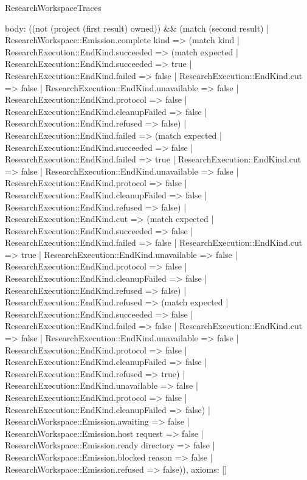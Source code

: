 \begin{lexlean}{ResearchWorkspaceTraces}
\begin{semanticmodule}
{ body: ((not (project (first result) owned)) && (match (second result) | ResearchWorkspace::Emission.complete kind => (match kind | ResearchExecution::EndKind.succeeded => (match expected | ResearchExecution::EndKind.succeeded => true | ResearchExecution::EndKind.failed => false | ResearchExecution::EndKind.cut => false | ResearchExecution::EndKind.unavailable => false | ResearchExecution::EndKind.protocol => false | ResearchExecution::EndKind.cleanupFailed => false | ResearchExecution::EndKind.refused => false) | ResearchExecution::EndKind.failed => (match expected | ResearchExecution::EndKind.succeeded => false | ResearchExecution::EndKind.failed => true | ResearchExecution::EndKind.cut => false | ResearchExecution::EndKind.unavailable => false | ResearchExecution::EndKind.protocol => false | ResearchExecution::EndKind.cleanupFailed => false | ResearchExecution::EndKind.refused => false) | ResearchExecution::EndKind.cut => (match expected | ResearchExecution::EndKind.succeeded => false | ResearchExecution::EndKind.failed => false | ResearchExecution::EndKind.cut => true | ResearchExecution::EndKind.unavailable => false | ResearchExecution::EndKind.protocol => false | ResearchExecution::EndKind.cleanupFailed => false | ResearchExecution::EndKind.refused => false) | ResearchExecution::EndKind.refused => (match expected | ResearchExecution::EndKind.succeeded => false | ResearchExecution::EndKind.failed => false | ResearchExecution::EndKind.cut => false | ResearchExecution::EndKind.unavailable => false | ResearchExecution::EndKind.protocol => false | ResearchExecution::EndKind.cleanupFailed => false | ResearchExecution::EndKind.refused => true) | ResearchExecution::EndKind.unavailable => false | ResearchExecution::EndKind.protocol => false | ResearchExecution::EndKind.cleanupFailed => false) | ResearchWorkspace::Emission.awaiting => false | ResearchWorkspace::Emission.host request => false | ResearchWorkspace::Emission.ready directory => false | ResearchWorkspace::Emission.blocked reason => false | ResearchWorkspace::Emission.refused => false)),
 axioms: []
}


\end{semanticmodule}
\end{lexlean}
